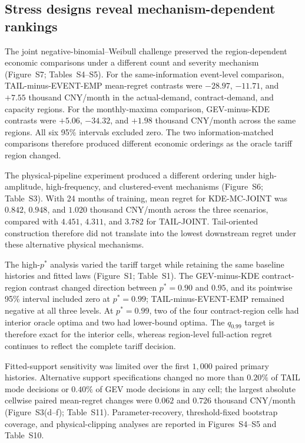 \documentclass[Times1COL]{WileyNJDv5}
\begin{document}
\subsection{Stress designs reveal mechanism-dependent rankings}
\label{sec:results-stress}

The joint negative-binomial--Weibull challenge preserved the
region-dependent economic comparisons under a different count and
severity mechanism (Figure~S7; Tables~S4--S5). For the
same-information event-level comparison, TAIL-minus-EVENT-EMP
mean-regret contrasts were $-28.97$, $-11.71$, and $+7.55$
thousand CNY/month in the actual-demand, contract-demand, and capacity
regions. For the monthly-maxima comparison, GEV-minus-KDE contrasts
were $+5.06$, $-34.32$, and $+1.98$ thousand CNY/month across
the same regions. All six 95\% intervals excluded zero. The two
information-matched comparisons therefore produced different economic
orderings as the oracle tariff region changed.

The physical-pipeline experiment produced a different ordering under
high-amplitude, high-frequency, and clustered-event mechanisms
(Figure~S6; Table~S3). With 24 months of training, mean regret for
KDE-MC-JOINT was $0.842$, $0.948$, and $1.020$ thousand CNY/month
across the three scenarios, compared with $4.451$, $4.311$, and
$3.782$ for TAIL-JOINT. Tail-oriented construction therefore did not
translate into the lowest downstream regret under these alternative
physical mechanisms.

The high-$p^\ast$ analysis varied the tariff target while retaining
the same baseline histories and fitted laws (Figure~S1; Table~S1).
The GEV-minus-KDE contract-region contrast changed direction between
$p^\ast=0.90$ and $0.95$, and its pointwise 95\% interval included
zero at $p^\ast=0.99$; TAIL-minus-EVENT-EMP remained negative at all
three levels. At $p^\ast=0.99$, two of the four contract-region cells
had interior oracle optima and two had lower-bound optima. The
$q_{0.99}$ target is therefore exact for the interior cells, whereas
region-level full-action regret continues to reflect the complete
tariff decision.

Fitted-support sensitivity was limited over the first $1{,}000$ paired
primary histories. Alternative support specifications changed no more
than $0.20\%$ of TAIL mode decisions or $0.40\%$ of GEV mode decisions
in any cell; the largest absolute cellwise paired mean-regret changes
were $0.062$ and $0.726$ thousand CNY/month
(Figure~S3(d--f); Table~S11). Parameter-recovery,
threshold-fixed bootstrap coverage, and physical-clipping analyses are
reported in Figures~S4--S5 and Table~S10.
\end{document}
